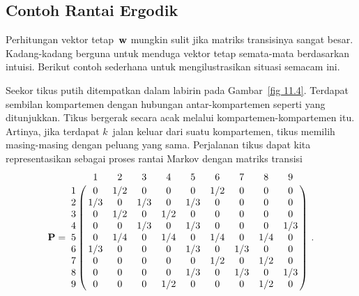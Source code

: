 \subsection*{Contoh Rantai Ergodik}

Perhitungan vektor tetap~${\mbox{\bf w}\/}$ mungkin sulit jika matriks transisinya sangat
besar. Kadang-kadang berguna untuk menduga vektor tetap semata-mata berdasarkan
intuisi. Berikut contoh sederhana untuk mengilustrasikan situasi semacam ini.

\begin{example}\label{exam 11.3.3}
Seekor tikus putih ditempatkan dalam labirin pada Gambar~\ref{fig
11.4}. Terdapat sembilan kompartemen dengan hubungan
antar-kompartemen seperti yang ditunjukkan. Tikus bergerak secara acak melalui
kompartemen-kompartemen itu. Artinya, jika terdapat $k$~jalan keluar dari suatu
kompartemen, tikus memilih masing-masing dengan peluang yang sama. Perjalanan
tikus dapat kita representasikan sebagai proses rantai Markov dengan matriks
transisi
$$
\mat {P} = \bordermatrix{
& 1 & 2 & 3 & 4 & 5 & 6 & 7 & 8 & 9 \cr
1 & 0 & 1/2 & 0 & 0 & 0 & 1/2 & 0 & 0 & 0 \cr
2 & 1/3 & 0 & 1/3 & 0 & 1/3 & 0 & 0 & 0 & 0 \cr
3 & 0 & 1/2 & 0 & 1/2 & 0 & 0 & 0 & 0 & 0 \cr
4 & 0 & 0 & 1/3 & 0 & 1/3 & 0 & 0 & 0 & 1/3 \cr
5 & 0 & 1/4 & 0 & 1/4 & 0 & 1/4 & 0 & 1/4 & 0 \cr
6 & 1/3 & 0 & 0 & 0 & 1/3 & 0 & 1/3 & 0 & 0 \cr
7 & 0 & 0 & 0 & 0 & 0 & 1/2 & 0 & 1/2 & 0 \cr
8 & 0 & 0 & 0 & 0 & 1/3 & 0 & 1/3 & 0 & 1/3 \cr
9 & 0 & 0 & 0 & 1/2 & 0 & 0 & 0 & 1/2 & 0}\ .
$$

 

\end{example}
